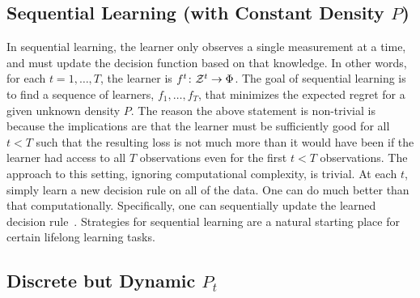 \documentclass{article}
\begin{document}
\subsection{Sequential Learning (with Constant Density $P$)}
\label{sec:constant}


In sequential learning, the learner only observes a single measurement at a time, and must update the decision function based on that knowledge.  In other words, for each $t = 1,\ldots, T$, the learner is $f^t {\colon} \mathcal{Z}^t \to \Phi$.  
%  
The goal of sequential learning is to find a sequence of learners, $f_1, \ldots, f_T$, that minimizes the expected regret for a given unknown density $P$.  The reason the above statement is non-trivial is because the implications are that the learner must be sufficiently good for all $t<T$ such that the resulting loss is not much more than it would have been if the learner had access to all $T$ observations even for the first $t<T$ observations.
% 
The approach to this setting, ignoring computational complexity, is trivial.  At each $t$, simply learn a new decision rule on all of the data. One can do much better than that computationally.  Specifically, one can sequentially update the learned decision rule~\cite{Xiao2010}. Strategies for sequential learning are a natural starting place for certain lifelong learning tasks.



\subsection{Discrete but Dynamic $P_t$}
\label{sec:jumps}
\end{document}
